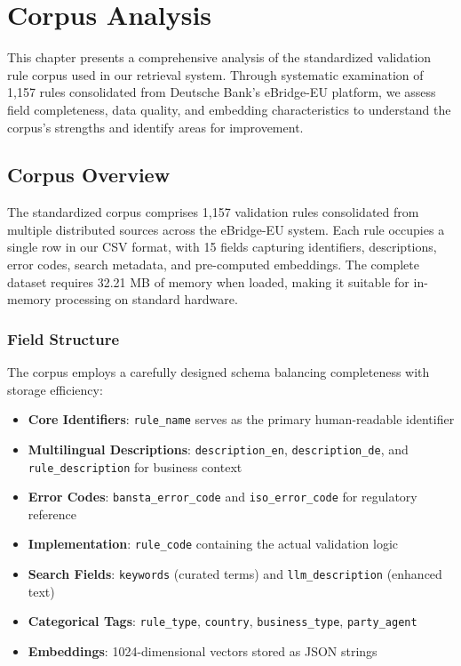 \chapter{Corpus Analysis}
\label{ch:corpus-analysis}

This chapter presents a comprehensive analysis of the standardized validation rule corpus used in our retrieval system. Through systematic examination of 1,157 rules consolidated from Deutsche Bank's eBridge-EU platform, we assess field completeness, data quality, and embedding characteristics to understand the corpus's strengths and identify areas for improvement.

\section{Corpus Overview}

The standardized corpus comprises 1,157 validation rules consolidated from multiple distributed sources across the eBridge-EU system. Each rule occupies a single row in our CSV format, with 15 fields capturing identifiers, descriptions, error codes, search metadata, and pre-computed embeddings. The complete dataset requires 32.21 MB of memory when loaded, making it suitable for in-memory processing on standard hardware.

\subsection{Field Structure}

The corpus employs a carefully designed schema balancing completeness with storage efficiency:

\begin{itemize}[leftmargin=*,itemsep=2pt,topsep=2pt]
 \item \textbf{Core Identifiers}: \texttt{rule\_name} serves as the primary human-readable identifier
 \item \textbf{Multilingual Descriptions}: \texttt{description\_en}, \texttt{description\_de}, and \texttt{rule\_description} for business context
 \item \textbf{Error Codes}: \texttt{bansta\_error\_code} and \texttt{iso\_error\_code} for regulatory reference
 \item \textbf{Implementation}: \texttt{rule\_code} containing the actual validation logic
 \item \textbf{Search Fields}: \texttt{keywords} (curated terms) and \texttt{llm\_description} (enhanced text)
 \item \textbf{Categorical Tags}: \texttt{rule\_type}, \texttt{country}, \texttt{business\_type}, \texttt{party\_agent}
 \item \textbf{Embeddings}: 1024-dimensional vectors stored as JSON strings
\end{itemize}

